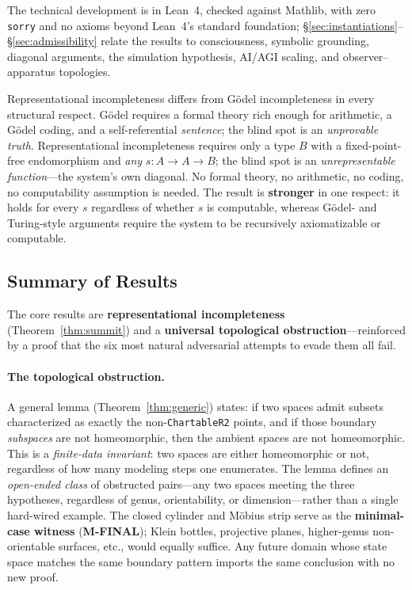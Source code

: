 \documentclass[11pt]{article}
\begin{document}
The technical development is in Lean~4, checked against Mathlib, with
zero \texttt{sorry} and no axioms beyond Lean~4's standard foundation;
\S\ref{sec:instantiations}--\S\ref{sec:admissibility} relate the
results to consciousness, symbolic grounding, diagonal arguments,
the simulation hypothesis, AI/AGI scaling, and observer--apparatus
topologies.

\begin{keybox}[title=This is not G\"odel repackaged]
Representational incompleteness differs from G\"odel incompleteness in
every structural respect.  G\"odel requires a formal theory rich enough
for arithmetic, a G\"odel coding, and a self-referential
\emph{sentence}; the blind spot is an \emph{unprovable truth}.
Representational incompleteness requires only a type $B$ with a
fixed-point-free endomorphism and \emph{any} $s : A \to A \to B$; the
blind spot is an \emph{unrepresentable function}---the system's own
diagonal.  No formal theory, no arithmetic, no coding, no
computability assumption is needed.  The result is \textbf{stronger}
in one respect: it holds for every $s$ regardless of whether $s$ is
computable, whereas G\"odel- and Turing-style arguments require the
system to be recursively axiomatizable or computable.
\end{keybox}

\subsection{Summary of Results}

The core results are \textbf{representational incompleteness}
(Theorem~\ref{thm:summit}) and a \textbf{universal topological
obstruction}---reinforced by a proof that the six most natural
adversarial attempts to evade them all fail.

\paragraph{The topological obstruction.}
A general lemma (Theorem~\ref{thm:generic}) states: if two spaces admit
subsets characterized as exactly the non-\texttt{ChartableR2} points, and
if those boundary \emph{subspaces} are not homeomorphic, then the ambient
spaces are not homeomorphic.  This is a \emph{finite-data invariant}: two
spaces are either homeomorphic or not, regardless of how many modeling
steps one enumerates.  The lemma defines an \emph{open-ended class} of
obstructed pairs---any two spaces meeting the three hypotheses, regardless
of genus, orientability, or dimension---rather than a single hard-wired
example.  The closed cylinder and M\"obius strip serve as the
\textbf{minimal-case witness} (\textbf{M-FINAL}); Klein bottles,
projective planes, higher-genus non-orientable surfaces, etc., would
equally suffice.  Any future domain whose state space matches the same
boundary pattern imports the same conclusion with no new proof.
\end{document}
